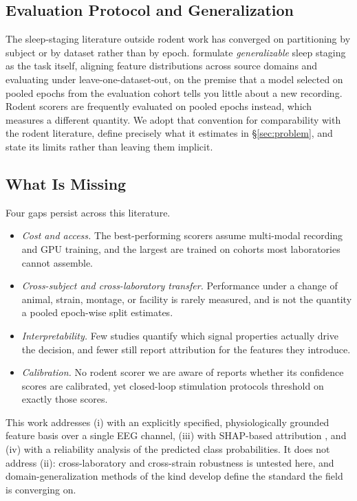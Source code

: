\subsection{Evaluation Protocol and Generalization}
The sleep-staging literature outside rodent work has converged on partitioning by subject or by dataset rather than by epoch. \citet{wang2024_sleepdg} formulate \emph{generalizable} sleep staging as the task itself, aligning feature distributions across source domains and evaluating under leave-one-dataset-out, on the premise that a model selected on pooled epochs from the evaluation cohort tells you little about a new recording. Rodent scorers are frequently evaluated on pooled epochs instead, which measures a different quantity. We adopt that convention for comparability with the rodent literature, define precisely what it estimates in \S\ref{sec:problem}, and state its limits rather than leaving them implicit.

\subsection{What Is Missing}
Four gaps persist across this literature.
\begin{itemize}\itemsep1pt\parskip0pt
\item[(i)] \emph{Cost and access.} The best-performing scorers assume multi-modal recording and GPU training, and the largest are trained on cohorts most laboratories cannot assemble.
\item[(ii)] \emph{Cross-subject and cross-laboratory transfer.} Performance under a change of animal, strain, montage, or facility is rarely measured, and is not the quantity a pooled epoch-wise split estimates.
\item[(iii)] \emph{Interpretability.} Few studies quantify which signal properties actually drive the decision, and fewer still report attribution for the features they introduce.
\item[(iv)] \emph{Calibration.} No rodent scorer we are aware of reports whether its confidence scores are calibrated, yet closed-loop stimulation protocols threshold on exactly those scores.
\end{itemize}
This work addresses (i) with an explicitly specified, physiologically grounded feature basis over a single EEG channel, (iii) with SHAP-based attribution \citep{lundberg2017_shap}, and (iv) with a reliability analysis of the predicted class probabilities. It does not address (ii): cross-laboratory and cross-strain robustness is untested here, and domain-generalization methods of the kind \citet{wang2024_sleepdg} develop define the standard the field is converging on.

